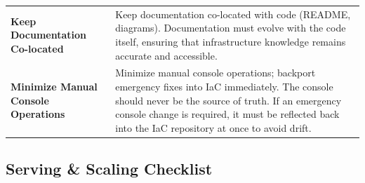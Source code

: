 {\begin{tabularx}{\linewidth}{@{}p{3.2cm}X@{}}
\textbf{Keep Documentation Co-located} & Keep documentation co-located with code (README, diagrams). Documentation must evolve with the code itself, ensuring that infrastructure knowledge remains accurate and accessible. \\
\textbf{Minimize Manual Console Operations} & Minimize manual console operations; backport emergency fixes into IaC immediately. The console should never be the source of truth. If an emergency console change is required, it must be reflected back into the IaC repository at once to avoid drift. \\
\end{tabularx}
}

\subsection{Serving \& Scaling Checklist}
\label{sec:bp-serving}

